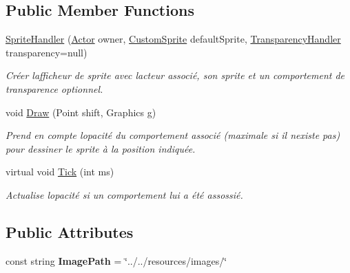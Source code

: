 \subsection*{Public Member Functions}
\begin{DoxyCompactItemize}
\item 
\hyperlink{class_tentacle_slicers_1_1graphics_1_1_sprite_handler_a8dfd4ea7a9dff06f584db2d3849bbfd0}{Sprite\+Handler} (\hyperlink{class_tentacle_slicers_1_1actors_1_1_actor}{Actor} owner, \hyperlink{class_tentacle_slicers_1_1graphics_1_1_custom_sprite}{Custom\+Sprite} default\+Sprite, \hyperlink{class_tentacle_slicers_1_1graphics_1_1_transparency_handler}{Transparency\+Handler} transparency=null)
\begin{DoxyCompactList}\small\item\em Créer l\textquotesingle{}afficheur de sprite avec l\textquotesingle{}acteur associé, son sprite et un comportement de transparence optionnel. \end{DoxyCompactList}\item 
void \hyperlink{class_tentacle_slicers_1_1graphics_1_1_sprite_handler_ab9e53b7c6c38418022bb94c99cba8ba5}{Draw} (Point shift, Graphics g)
\begin{DoxyCompactList}\small\item\em Prend en compte l\textquotesingle{}opacité du comportement associé (maximale si il n\textquotesingle{}existe pas) pour dessiner le sprite à la position indiquée. \end{DoxyCompactList}\item 
virtual void \hyperlink{class_tentacle_slicers_1_1graphics_1_1_sprite_handler_ab08b58ee3a955cbb5621d8aa4e32c97b}{Tick} (int ms)
\begin{DoxyCompactList}\small\item\em Actualise l\textquotesingle{}opacité si un comportement lui a été assossié. \end{DoxyCompactList}\end{DoxyCompactItemize}
\subsection*{Public Attributes}
\begin{DoxyCompactItemize}
\item 
\mbox{\label{class_tentacle_slicers_1_1graphics_1_1_sprite_handler_a0359418a08cd2bb9900feac3c860b2ff}} 
const string {\bfseries Image\+Path} = \char`\"{}../../resources/images/\char`\"{}
\end{DoxyCompactItemize}
